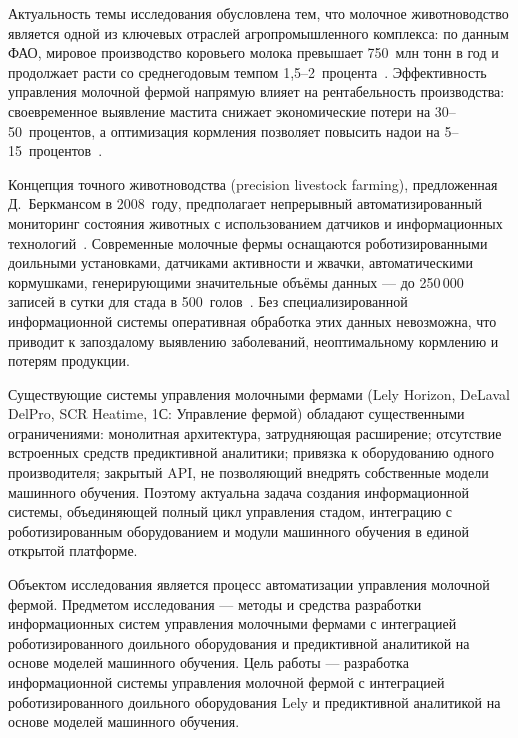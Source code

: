 \introduction

Актуальность темы исследования обусловлена тем, что молочное животноводство является одной из ключевых отраслей агропромышленного комплекса: по данным ФАО, мировое производство коровьего молока превышает 750~млн тонн в год и продолжает расти со среднегодовым темпом 1,5--2~процента~\cite{PrecisionLivestock}. Эффективность управления молочной фермой напрямую влияет на рентабельность производства: своевременное выявление мастита снижает экономические потери на 30--50~процентов, а оптимизация кормления позволяет повысить надои на 5--15~процентов~\cite{DairyPrecision}.

Концепция точного животноводства (precision livestock farming), предложенная Д.~Беркмансом в 2008~году, предполагает непрерывный автоматизированный мониторинг состояния животных с использованием датчиков и информационных технологий~\cite{PrecisionLivestock}. Современные молочные фермы оснащаются роботизированными доильными установками, датчиками активности и жвачки, автоматическими кормушками, генерирующими значительные объёмы данных --- до 250\,000 записей в сутки для стада в 500~голов~\cite{DairyPrecision}. Без специализированной информационной системы оперативная обработка этих данных невозможна, что приводит к запоздалому выявлению заболеваний, неоптимальному кормлению и потерям продукции.

Существующие системы управления молочными фермами (Lely Horizon, DeLaval DelPro, SCR Heatime, 1С: Управление фермой) обладают существенными ограничениями: монолитная архитектура, затрудняющая расширение; отсутствие встроенных средств предиктивной аналитики; привязка к оборудованию одного производителя; закрытый API, не позволяющий внедрять собственные модели машинного обучения. Поэтому актуальна задача создания информационной системы, объединяющей полный цикл управления стадом, интеграцию с роботизированным оборудованием и модули машинного обучения в единой открытой платформе.

Объектом исследования является процесс автоматизации управления молочной фермой. Предметом исследования --- методы и средства разработки информационных систем управления молочными фермами с интеграцией роботизированного доильного оборудования и предиктивной аналитикой на основе моделей машинного обучения. Цель работы --- разработка информационной системы управления молочной фермой с интеграцией роботизированного доильного оборудования Lely и предиктивной аналитикой на основе моделей машинного обучения.

